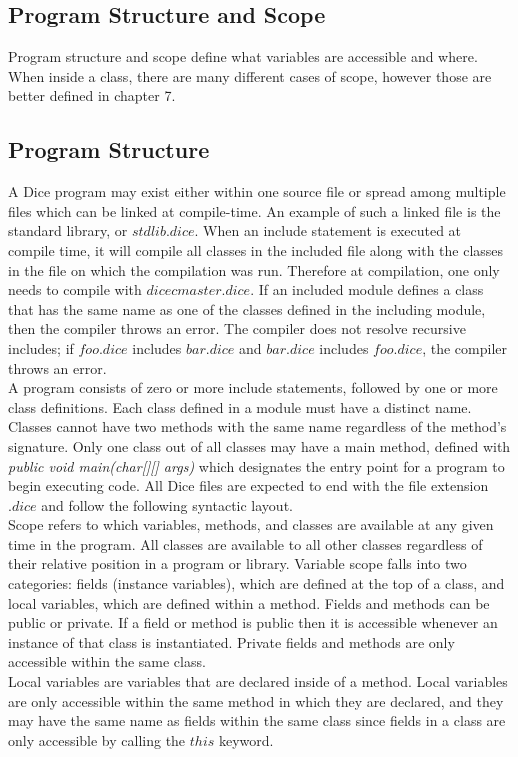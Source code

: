\begin{homeworkProblem}
	\section{Program Structure and Scope}
	
	Program structure and scope define what variables are accessible and where. When inside a class, there are many different cases of scope, however those are better defined in chapter 7. 
	
	\subsection{Program Structure}
	
	A Dice program may exist either within one source file or spread among multiple files which can be linked at compile-time. An example of such a linked file is the standard library, or $stdlib.dice$. When an include statement is executed at compile time, it will compile all classes in the included file along with the classes in the file on which the compilation was run. Therefore at compilation, one only needs to compile with $dicec master.dice$. If an included module defines a class that has the same name as one of the classes defined in the including module, then the compiler throws an error. The compiler does not resolve recursive includes; if $foo.dice$ includes $bar.dice$ and $bar.dice$ includes $foo.dice$, the compiler throws an error.\\
	
	A program consists of zero or more include statements, followed by one or more class definitions. Each class defined in a module must have a distinct name. Classes cannot have two methods with the same name regardless of the method's signature. Only one class out of all classes may have a main method, defined with \textit{public void main(char[][] args)} which designates the entry point for a program to begin executing code. All Dice files are expected to end with the file extension $.dice$ and follow the following syntactic layout. \\
	
	Scope refers to which variables, methods, and classes are available at any given time in the program. All classes are available to all other classes regardless of their relative position in a program or library. Variable scope falls into two categories: fields (instance variables), which are defined at the top of a class, and local variables, which are defined within a method. Fields and methods can be public or private. If a field or method is public then it is accessible whenever an instance of that class is instantiated. Private fields and methods are only accessible within the same class.\\
	
	Local variables are variables that are declared inside of a method. Local variables are only accessible within the same method in which they are declared, and they may have the same name as fields within the same class since fields in a class are only accessible by calling the $this$ keyword.\\
	
\end{homeworkProblem}

